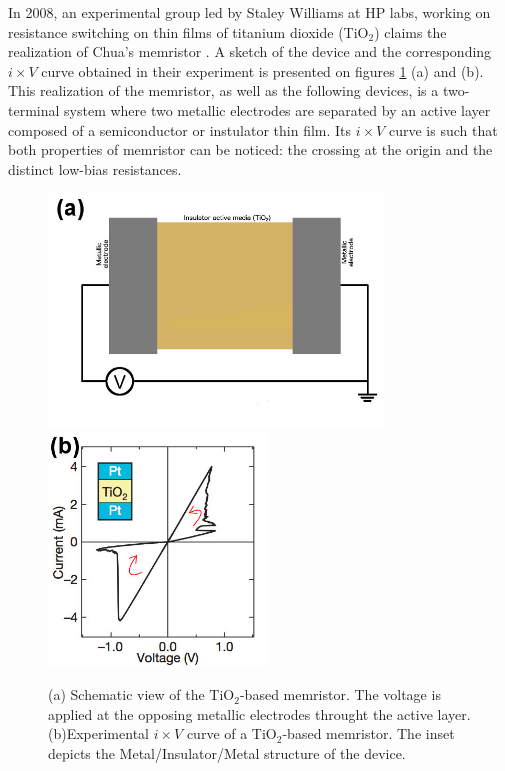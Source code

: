 In 2008, an experimental group led by Staley Williams at HP labs, working on resistance switching on thin films of titanium dioxide (TiO$_2$) claims the realization of Chua's memristor \cite{Williams2008}. A sketch of the device and the corresponding $i \times V$ curve obtained in their experiment is presented on figures \ref{fig:curva_hp_labs} (a) and (b). This realization of the memristor, as well as the following devices, is a two-terminal system where two metallic electrodes are separated by an active layer composed of a semiconductor or instulator thin film. Its $i \times V$ curve is such that both properties of memristor can be noticed: the crossing at the origin and the distinct low-bias resistances.
\begin{center}
  \begin{figure}[h!]
    \begin{center}
    \includegraphics[height=6.2cm]{img/memristor-intro.jpg}
    \includegraphics[height=6.2cm]{img/exp-HP.jpg}
      \caption{(a) Schematic view of the TiO$_2$-based memristor. The voltage is applied at the opposing metallic electrodes throught the active layer. (b)Experimental $i \times V$ curve of a TiO$_2$-based memristor. The inset depicts the Metal/Insulator/Metal structure of the device\cite{Williams2008}.} 
      \label{fig:curva_hp_labs} 
    \end{center}
  \end{figure}
\end{center}

